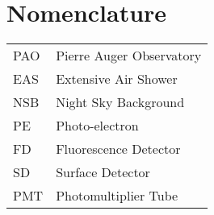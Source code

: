 \chapter*{Nomenclature}


\begin{tabular}{p{8em} p{30em}}
PAO & Pierre Auger Observatory \\
EAS & Extensive Air Shower \\
NSB & Night Sky Background \\
PE & Photo-electron \\
FD & Fluorescence Detector \\
SD & Surface Detector \\
PMT & Photomultiplier Tube
\end{tabular}
